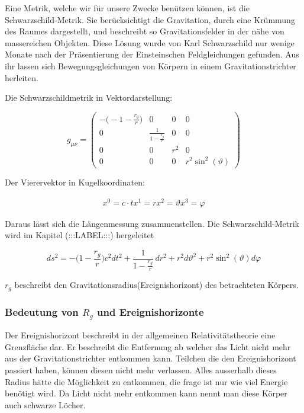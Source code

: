 \begin{refsection}
	Eine Metrik, welche wir für unsere Zwecke benützen können, ist die Schwarzschild-Metrik. Sie berücksichtigt die Gravitation, durch eine Krümmung des Raumes dargestellt, und beschreibt so Gravitationsfelder in der nähe von massereichen Objekten. Diese Lösung wurde von Karl Schwarzschild nur wenige Monate nach der Präsentierung der Einsteinschen Feldgleichungen gefunden. Aus ihr lassen sich Bewegungsgleichungen von Körpern in einem Gravitationstrichter herleiten.
	
	Die Schwarzschildmetrik in Vektordarstellung:



	\begin{equation}
		g_{\mu\nu}=
		\begin{pmatrix}
		-\biggl(-1-\frac{r_{g}}{r}\biggr) & 0 & 0 & 0 \\
		0 & \frac{1}{\displaystyle1-\frac{r_{g}}{r}} & 0 & 0 \\
		0 & 0 & r^{2} & 0 \\
		0 & 0 & 0 & r^{2}\sin^{2}(\vartheta)
		\end{pmatrix}
	\end{equation}

	Der Vierervektor in Kugelkoordinaten:

	\begin{align*}
		x^{0}=c\cdot t
		x^{1}=r
		x^{2}=\vartheta
		x^{3}=\varphi
	\end{align*}

	Daraus lässt sich die Längenmessung zusammenstellen. Die Schwarzschild-Metrik wird im Kapitel (:::LABEL:::) hergeleitet

	\begin{equation}
	ds^2
	=
	-\biggl(1-\frac{r_g}r\biggr)c^2dt^2
	+
	\frac{1}{\displaystyle 1-\frac{r_g}r}\,dr^2 
	+
	r^2d\vartheta^2 
	+ 
	r^2\sin^2(\vartheta)d\varphi
	\end{equation}

	$r_g$ beschreibt den Gravitationsradius(Ereignishorizont) des betrachteten Körpers.

	\subsubsection{Bedeutung von $R_{g}$ und Ereignishorizonte}


	Der Ereignishorizont beschreibt in der allgemeinen Relativitätstheorie eine Grenzfläche dar. Er beschreibt die Entfernung ab welcher das Licht nicht mehr aus der Gravitationstrichter entkommen kann. Teilchen die den Ereignishorizont passiert haben, können diesen nicht mehr verlassen. Alles ausserhalb dieses Radius hätte die Möglichkeit zu entkommen, die frage ist nur wie viel Energie benötigt wird. Da Licht nicht mehr entkommen kann nennt man diese Körper auch schwarze Löcher.
	

\end{refsection}
